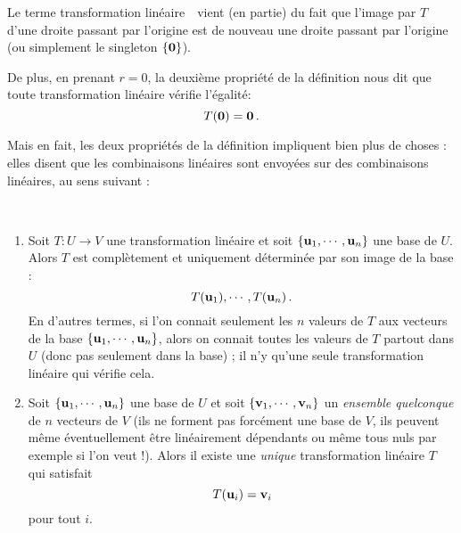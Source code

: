 Le terme \og transformation linéaire\ \fg\ vient (en partie) du fait que
l'image par $T$ d'une droite passant par l'origine est de nouveau une droite passant par l'origine (ou simplement le singleton $\{\mathbf{0}\}$).

De plus, en prenant $r=0$, la deuxième propriété de la définition nous dit que toute transformation linéaire vérifie l'égalité:
$$T(\mathbf{0}) = \mathbf{0}\,.$$

Mais en fait, les deux propriétés de la définition impliquent bien plus de choses : elles disent que les combinaisons linéaires sont envoyées sur des combinaisons linéaires, au sens suivant :

\begin{theorem}\label{Thm:LTbasis} 
~
\begin{enumerate}
\item Soit $T \colon U \to V$ une transformation linéaire et soit
$\{ \mathbf{u}_1, \cdots, \mathbf{u}_n\}$ une base de $U$.  Alors $T$
est complètement et uniquement déterminée par son image de la base : 
$$T(\mathbf{u}_1), \cdots,
T(\mathbf{u}_n)\,.$$
En d'autres termes, si l'on connait seulement les $n$ valeurs de $T$ aux vecteurs de la base $\{ \mathbf{u}_1, \cdots, \mathbf{u}_n\}$, alors on connait toutes les valeurs de $T$ partout dans $U$ (donc pas seulement dans la base) ; il n'y qu'une seule transformation linéaire qui vérifie cela.
\item Soit $\{ \mathbf{u}_1, \cdots, \mathbf{u}_n\}$ une base de $U$
et soit $\{ \mathbf{v}_1, \cdots, \mathbf{v}_n\}$ un  {\it ensemble quelconque} de $n$ vecteurs de $V$ (ils ne forment pas forcément une base de $V$, ils peuvent même
éventuellement être lin\'eairement dépendants ou même tous nuls par exemple si l'on veut !).  Alors il existe une \emph{unique} transformation 
linéaire $T$ qui satisfait $$T(\mathbf{u}_i)=\mathbf{v}_i$$ pour tout $i$.
\end{enumerate}
\end{theorem}

